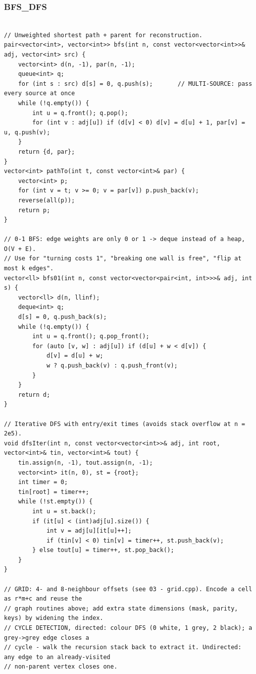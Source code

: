\documentclass[9pt,a4paper,twocolumn]{extarticle}
\begin{document}
\filbreak
\subsubsection{BFS\_DFS}
\nopagebreak
\begin{lstlisting}

// Unweighted shortest path + parent for reconstruction.
pair<vector<int>, vector<int>> bfs(int n, const vector<vector<int>>& adj, vector<int> src) {
    vector<int> d(n, -1), par(n, -1);
    queue<int> q;
    for (int s : src) d[s] = 0, q.push(s);       // MULTI-SOURCE: pass every source at once
    while (!q.empty()) {
        int u = q.front(); q.pop();
        for (int v : adj[u]) if (d[v] < 0) d[v] = d[u] + 1, par[v] = u, q.push(v);
    }
    return {d, par};
}
vector<int> pathTo(int t, const vector<int>& par) {
    vector<int> p;
    for (int v = t; v >= 0; v = par[v]) p.push_back(v);
    reverse(all(p));
    return p;
}

// 0-1 BFS: edge weights are only 0 or 1 -> deque instead of a heap, O(V + E).
// Use for "turning costs 1", "breaking one wall is free", "flip at most k edges".
vector<ll> bfs01(int n, const vector<vector<pair<int, int>>>& adj, int s) {
    vector<ll> d(n, llinf);
    deque<int> q;
    d[s] = 0, q.push_back(s);
    while (!q.empty()) {
        int u = q.front(); q.pop_front();
        for (auto [v, w] : adj[u]) if (d[u] + w < d[v]) {
            d[v] = d[u] + w;
            w ? q.push_back(v) : q.push_front(v);
        }
    }
    return d;
}

// Iterative DFS with entry/exit times (avoids stack overflow at n = 2e5).
void dfsIter(int n, const vector<vector<int>>& adj, int root, vector<int>& tin, vector<int>& tout) {
    tin.assign(n, -1), tout.assign(n, -1);
    vector<int> it(n, 0), st = {root};
    int timer = 0;
    tin[root] = timer++;
    while (!st.empty()) {
        int u = st.back();
        if (it[u] < (int)adj[u].size()) {
            int v = adj[u][it[u]++];
            if (tin[v] < 0) tin[v] = timer++, st.push_back(v);
        } else tout[u] = timer++, st.pop_back();
    }
}

// GRID: 4- and 8-neighbour offsets (see 03 - grid.cpp). Encode a cell as r*m+c and reuse the
// graph routines above; add extra state dimensions (mask, parity, keys) by widening the index.
// CYCLE DETECTION, directed: colour DFS (0 white, 1 grey, 2 black); a grey->grey edge closes a
// cycle - walk the recursion stack back to extract it. Undirected: any edge to an already-visited
// non-parent vertex closes one.
\end{lstlisting}
\end{document}
